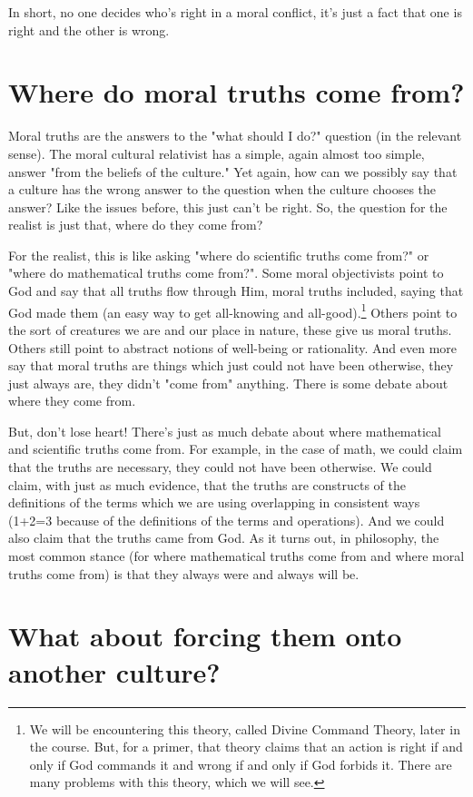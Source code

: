 In short, no one decides who's right in a moral conflict, it's just a fact that one is right and the other is wrong.
\section{Where do moral truths come from?}

Moral truths are the answers to the "what should I do?" question (in the relevant sense). The moral cultural relativist has a simple, again almost too simple, answer "from the beliefs of the culture." Yet again, how can we possibly say that a culture has the wrong answer to the question when the culture chooses the answer? Like the issues before, this just can't be right. So, the question for the realist is just that, where do they come from? 

For the realist, this is like asking "where do scientific truths come from?" or "where do mathematical truths come from?". Some moral objectivists point to God and say that all truths flow through Him, moral truths included, saying that God made them (an easy way to get all-knowing and all-good).\footnote{We will be encountering this theory, called Divine Command Theory, later in the course. But, for a primer, that theory claims that an action is right if and only if God commands it and wrong if and only if God forbids it. There are many problems with this theory, which we will see.} Others point to the sort of creatures we are and our place in nature, these give us moral truths. Others still point to abstract notions of well-being or rationality.  And even more say that moral truths are things which just could not have been otherwise, they just always are, they didn't "come from" anything. There is some debate about where they come from.

But, don't lose heart! There's just as much debate about where mathematical and scientific truths come from. For example, in the case of math, we could claim that the truths are necessary, they could not have been otherwise. We could claim, with just as much evidence, that the truths are constructs of the definitions of the terms which we are using overlapping in consistent ways (1+2=3 because of the definitions of the terms and operations). And we could also claim that the truths came from God.  As it turns out, in philosophy, the most common stance (for where mathematical truths come from and where moral truths come from) is that they always were and always will be.
\section{What about forcing them onto another culture?}

